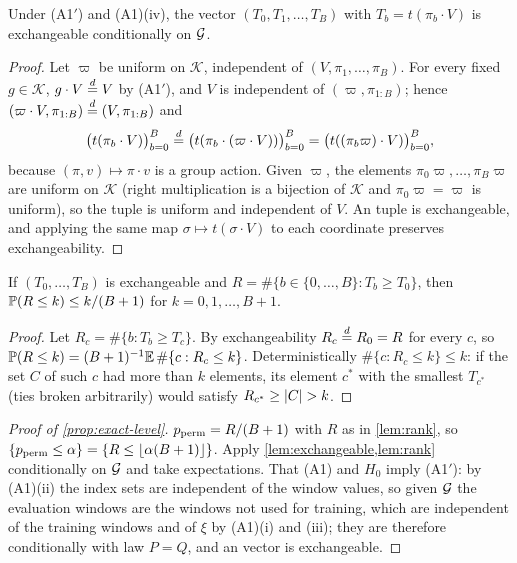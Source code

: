 \begin{lemma}\label{lem:exchangeable}
Under (A1$'$) and (A1)(iv), the vector $(T_0,T_1,\dots,T_B)$ with $T_b=t(\pi_b\cdot V)$ is
exchangeable conditionally on $\mathcal{G}$.
\end{lemma}

\begin{proof}
Let $\varpi$ be uniform on $\mathcal K$, independent of $(V,\pi_1,\dots,\pi_B)$. For every fixed
$g\in\mathcal K$, $g\cdot V\overset{d}{=} V$ by (A1$'$), and $V$ is independent of $(\varpi,\pi_{1:B})$; hence
$(\varpi\cdot V,\pi_{1:B})\overset{d}{=}(V,\pi_{1:B})$ and
\[
  \big(t(\pi_b\cdot V)\big)_{b=0}^B\overset{d}{=}\big(t(\pi_b\cdot(\varpi\cdot V))\big)_{b=0}^B
  =\big(t((\pi_b\varpi)\cdot V)\big)_{b=0}^B ,
\]
because $(\pi,v)\mapsto\pi\cdot v$ is a group action. Given $\varpi$, the elements
$\pi_0\varpi,\dots,\pi_B\varpi$ are \iid{} uniform on $\mathcal K$ (right multiplication is a
bijection of $\mathcal K$ and $\pi_0\varpi=\varpi$ is uniform), so the tuple is \iid{} uniform and
independent of $V$. An \iid{} tuple is exchangeable, and applying the same map
$\sigma\mapsto t(\sigma\cdot V)$ to each coordinate preserves exchangeability.
\end{proof}

\begin{lemma}\label{lem:rank}
If $(T_0,\dots,T_B)$ is exchangeable and $R=\#\{b\in\{0,\dots,B\}:T_b\ge T_0\}$, then
$\mathbb{P}(R\le k)\le k/(B+1)$ for $k=0,1,\dots,B+1$.
\end{lemma}

\begin{proof}
Let $R_c=\#\{b:T_b\ge T_c\}$. By exchangeability $R_c\overset{d}{=} R_0=R$ for every $c$, so
$\mathbb{P}(R\le k)=(B+1)^{-1}\mathbb{E}\,\#\{c:R_c\le k\}$. Deterministically $\#\{c:R_c\le k\}\le k$: if the
set $C$ of such $c$ had more than $k$ elements, its element $c^*$ with the smallest $T_{c^*}$
(ties broken arbitrarily) would satisfy $R_{c^*}\ge\lvert C\rvert>k$.
\end{proof}

\begin{proof}[Proof of \cref{prop:exact-level}]
$p_{\mathrm{perm}}=R/(B+1)$ with $R$ as in \cref{lem:rank}, so
$\{p_{\mathrm{perm}}\le\alpha\}=\{R\le\lfloor\alpha(B+1)\rfloor\}$. Apply \cref{lem:exchangeable,lem:rank}
conditionally on $\mathcal{G}$ and take expectations. That (A1) and $H_0$ imply (A1$'$): by (A1)(ii)
the index sets are independent of the window values, so given $\mathcal{G}$ the evaluation windows are
the windows not used for training, which are independent of the training windows and of $\xi$
by (A1)(i) and (iii); they are therefore conditionally \iid{} with law $P=Q$, and an \iid{}
vector is exchangeable.
\end{proof}

